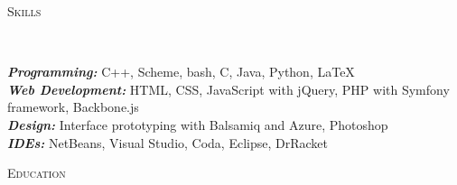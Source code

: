\documentclass[9pt]{article}
\newenvironment{changemargin}[2]{%
  \begin{list}{}{%
    \setlength{\topsep}{0pt}%
    \setlength{\leftmargin}{#1}%
    \setlength{\rightmargin}{#2}%
    \setlength{\listparindent}{\parindent}%
    \setlength{\itemindent}{\parindent}%
    \setlength{\parsep}{\parskip}%
  }%
  \item[]}{\end{list}
}
\newcommand{\lineover}{
	\begin{changemargin}{-0.05in}{-0.05in}
		\vspace*{-8pt}
		\hrulefill \\
		\vspace*{-2pt}
	\end{changemargin}
}
\newcommand{\header}[1]{
	\begin{changemargin}{-0.5in}{-0.5in}
		\scshape{#1}\\
  	\lineover
	\end{changemargin}
}
\newenvironment{body} {
	\vspace*{-16pt}
	\begin{changemargin}{-0.25in}{-0.5in}
  }	
	{\end{changemargin}
}
\begin{document}


\header{Skills}

\begin{body}
	\vspace{14pt}
	\emph{\textbf{Programming:}}{} C++, Scheme, bash, C, Java, Python, \LaTeX\\
	\medskip
	\emph{\textbf{Web Development:}}{} HTML, CSS, JavaScript with jQuery, PHP with Symfony framework, Backbone.js\\
	\medskip
	\emph{\textbf{Design:}}{} Interface prototyping with Balsamiq and Azure, Photoshop\\
	\medskip
	\emph{\textbf{IDEs:}}{} NetBeans, Visual Studio, Coda, Eclipse, DrRacket\\
\end{body}

\smallskip


\header{Education}
\end{document}
